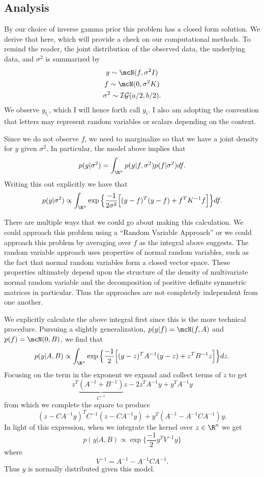 \documentclass{report}
\begin{document}
\subsection{Analysis}

By our choice of inverse gamma prior this problem has a closed form solution.  We derive that here, which will provide a check on our computational methods.  To remind the reader, the joint distribution of the observed data, the underlying data, and $\sigma^2$ is summarized by
\begin{gather*}
y \sim \mcN(f, \sigma^2 I) \\
f \sim \mcN(0, \sigma^2 K) \\
\sigma^2 \sim \mathcal{IG}(a/2,b/2).
\end{gather*}
We observe $y_{t_i}$, which I will hence forth call $y_i$.  I also am adopting the convention that letters may represent random variables or scalars depending on the context.  

Since we do not observe $f$, we need to marginalize so that we have a joint density for $y$ given $\sigma^2$.  In particular, the model above implies that
\[
p(y | \sigma^2) = \int_{\R^n} p(y | f, \sigma^2) p(f | \sigma^2) df.
\]
Writing this out explicitly we have that
\[
p(y | \sigma^2) \propto \int_{\R^n} \exp \Big\{ \frac{-1}{2 \sigma^2} \Big[ (y-f)^T(y-f) + f^T K^{-1} f \Big] \Big\} df.
\]

There are multiple ways that we could go about making this calculation.  We could approach this problem using a ``Random Variable Approach'' or we could approach this problem by averaging over $f$ as the integral above suggests.  The random variable approach uses properties of normal random variables, such as the fact that normal random variables form a closed vector space.  These properties ultimately depend upon the structure of the density of multivariate normal random variable and the decomposition of positive definite symmetric matrices in particular.  Thus the approaches are not completely independent from one another.

We explicitly calculate the above integral first since this is the more technical procedure.  Pursuing a slightly generalization, 
$p(y|f) = \mcN(f, A)$ and $p(f) = \mcN(0, B)$, we find that
\[
p(y | A, B) \propto \int_{\R^n} \exp \Big\{ \frac{-1}{2} \Big[ (y-z)^T A^{-1}(y-z) + z^T B^{-1} z \Big] \Big\} dz.
\]
Focusing on the term in the exponent we expand and collect terms of $z$ to get
\[
z^T \underbrace{(A^{-1} + B^{-1})}_{C^{-1}} z - 2 z^T A^{-1} y + y^T A^{-1} y
\]
from which we complete the square to produce
\[
(z - CA^{-1}y)^T C^{-1} (z - CA^{-1} y) + y^T(A^{-1} - A^{-1} C A^{-1}) y.
\]
In light of this expression, when we integrate the kernel over $z \in \R^n$ we get
\[
p(y | A, B) \propto \exp \Big\{ \frac{-1}{2} y^T V^{-1} y \Big\}
\]
where
\[
V^{-1} = A^{-1} - A^{-1} C A^{-1}.
\]
Thus $y$ is normally distributed given this model.
\end{document}
